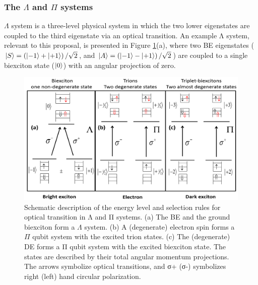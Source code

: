 
\subsubsection{The $\Lambda$ and $\Pi$ systems}
$\Lambda$ system is a three-level physical system in which the two lower eigenstates are coupled to the third eigenstate via an optical transition.
An example Λ system, relevant to this proposal, is presented in Figure \ref{fig:PiSystem}(a), where two BE eigenstates ($\ket{S}= \left( \ket{-1}+\ket{+1} \right)/\sqrt{2}$, and $\ket{A}= \left( \ket{-1}-\ket{+1} \right)/\sqrt{2}$) are coupled to a single biexciton state ($\ket{0}$) with an angular projection of zero.
\begin{figure}[H]
	\centering
	\includegraphics[scale=0.31]{figures/Lambda_System.png}
	\caption{Schematic description of the energy level and selection rules for
optical transition in Λ and Π systems. (a) The BE and the ground biexciton form a $\Lambda$ system. (b) A (degenerate) electron spin forms a $\Pi$ qubit system
with the excited trion states. (c) The (degenerate) DE forms a Π qubit system
with the excited biexciton state. The states are described by their total
angular momentum projections. The arrows symbolize optical transitions, and σ+ (σ-) symbolizes right (left) hand circular polarization.}
	\label{fig:PiSystem}
\end{figure}
